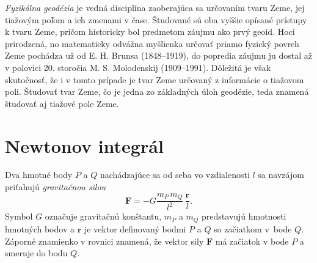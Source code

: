 \documentclass[a4paper, 12pt]{book}
\let\vec\mathbf
\begin{document}
\emph{Fyzikálna geodézia} je vedná disciplína zaoberajúca sa určovaním tvaru 
Zeme, jej tiažovým poľom a ich zmenami v čase.  Študované sú oba vyššie opísané 
prístupy k tvaru Zeme, pričom historicky bol predmetom záujmu ako prvý geoid.  
Hoci prirodzená, no matematicky odvážna myšlienka určovať priamo fyzický povrch 
Zeme pochádza už od E. H. Brunsa (1848--1919), do popredia záujmu ju dostal až 
v polovici 20. storočia M. S. Molodenskij (1909--1991).  Dôležitá je však 
skutočnosť, že i v tomto prípade je tvar Zeme určovaný z informácie o tiažovom 
poli.  Študovať tvar Zeme, čo je jedna zo základných úloh geodézie, teda 
znamená študovať aj tiažové pole Zeme.

\section{Newtonov integrál}


Dva hmotné body $P$ a $Q$ nachádzajúce sa od seba vo vzdialenosti $l$ sa 
navzájom priťahujú \emph{gravitačnou silou}
%
\begin{equation}
\label{eq:gravitational_law}
\vec F = -G \frac{m_P \, m_Q}{l^2} \, \frac{\vec r}{l}{.}
\end{equation}
%
Symbol $G$ označuje gravitačnú konštantu, $m_P$ a $m_Q$ predstavujú hmotnosti 
hmotných bodov a $\vec r$ je vektor definovaný bodmi $P$ a $Q$ so začiatkom 
v~bode $Q$.  Záporné znamienko v rovnici znamená, že vektor sily $\vec F$ má 
začiatok v bode $P$ a smeruje do bodu $Q$.
\end{document}
